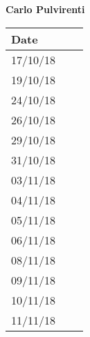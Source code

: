 \documentclass[../main.tex]{subfiles}
\begin{document}
\begin{center}
	{\bf Carlo Pulvirenti}
	\vspace{2mm}

		\begin{tabular}{p{1.3cm}|p{1.8cm}|p{6.7cm}}
			\hline
			\bf Date & \bf \makebox[1.8cm][c]{Hours} & \bf \makebox[6.7cm][c]{Description} \\
			\hline
			17/10/18 & \makebox[1.8cm][c]{2h} & \makebox[6.7cm][c]{Introduction}\\
			19/10/18 & \makebox[1.8cm][c]{3h} & \makebox[6.7cm][c]{Goals, Requirements, Domain assumptions}\\
			24/10/18 & \makebox[1.8cm][c]{4h} & \makebox[6.7cm][c]{Goals, Requirements, Domain assumptions}\\
			26/10/18 & \makebox[1.8cm][c]{2h} & \makebox[6.7cm][c]{Purpose, Scope}\\
			29/10/18 & \makebox[1.8cm][c]{6h} & \makebox[6.7cm][c]{Use Cases}\\
			31/10/18 & \makebox[1.8cm][c]{5h} & \makebox[6.7cm][c]{Use Cases}\\
			03/11/18 & \makebox[1.8cm][c]{4h} & \makebox[6.7cm][c]{Mockups, Scenarios}\\
			04/11/18 & \makebox[1.8cm][c]{5h} & \makebox[6.7cm][c]{UML Class \& State Machine Diagrams}\\
			05/11/18 & \makebox[1.8cm][c]{4h} & \makebox[6.7cm][c]{Scenarios, Sequence Diagram}\\
			06/11/18 & \makebox[1.8cm][c]{1h} & \makebox[6.7cm][c]{Mockups, Alloy}\\
			08/11/18 & \makebox[1.8cm][c]{2h} & \makebox[6.7cm][c]{Mockups, Sequence Diagramm, Alloy}\\
			09/11/18 & \makebox[1.8cm][c]{4h} & \makebox[6.7cm][c]{Alloy, Revisioning}\\
			10/11/18 & \makebox[1.8cm][c]{2h} & \makebox[6.7cm][c]{Alloy, Revisioning}\\
			11/11/18 & \makebox[1.8cm][c]{4h} & \makebox[6.7cm][c]{Revisioning}\\
		\end{tabular}
\end{center}

\vspace{1cm}

\newpage
\end{document}
